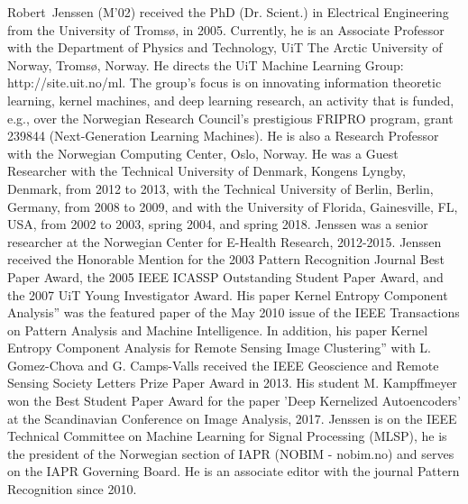 \documentclass[journal]{IEEEtran}
\begin{document}
\begin{IEEEbiography}{Robert~Jenssen}
(M’02) received the PhD (Dr. Scient.) in Electrical Engineering from the University of Troms{\o}, in 2005.
Currently, he is an Associate Professor with the Department of Physics and Technology, UiT The Arctic University of Norway, Troms{\o}, Norway. He directs the UiT Machine Learning Group: http://site.uit.no/ml. The group's focus is on innovating information theoretic learning, kernel machines, and deep learning research, an activity that is funded, e.g., over the Norwegian Research Council's prestigious FRIPRO program, grant 239844 (Next-Generation Learning Machines). He is also a Research Professor with the Norwegian Computing Center, Oslo, Norway. He was a Guest Researcher with the Technical University of Denmark, Kongens Lyngby, Denmark, from 2012 to 2013, with the Technical University of Berlin, Berlin, Germany, from 2008 to 2009, and with the University of Florida, Gainesville, FL, USA, from 2002 to 2003, spring 2004, and spring 2018. Jenssen was a senior researcher at the Norwegian Center for E-Health Research, 2012-2015. Jenssen received the Honorable Mention for the 2003 Pattern Recognition Journal Best Paper Award, the 2005 IEEE ICASSP Outstanding Student Paper Award, and the 2007 UiT Young Investigator Award. His paper Kernel Entropy Component Analysis” was the featured paper of the May 2010 issue of the IEEE Transactions on Pattern Analysis and Machine Intelligence. In addition, his paper Kernel Entropy Component Analysis for Remote Sensing Image Clustering” with L. Gomez-Chova and G. Camps-Valls received the IEEE Geoscience and Remote Sensing Society Letters Prize Paper Award in 2013. His student M. Kampffmeyer won the Best Student Paper Award for the paper 'Deep Kernelized Autoencoders' at the Scandinavian Conference on Image Analysis, 2017. Jenssen is on the IEEE Technical Committee on Machine Learning for Signal Processing (MLSP), he is the president of the Norwegian section of IAPR (NOBIM - nobim.no) and serves on the IAPR Governing Board. He is an associate editor with the journal Pattern Recognition since 2010.
\end{IEEEbiography}

\end{document}

